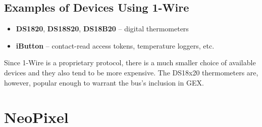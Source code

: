 \subsection{Examples of Devices Using 1-Wire}

\begin{itemize}
	\item \textbf{DS1820}, \textbf{DS18S20}, \textbf{DS18B20} -- digital thermometers
	\item \textbf{iButton} -- contact-read access tokens, temperature loggers, etc.
\end{itemize}

Since 1-Wire is a proprietary protocol, there is a much smaller choice of available devices and they also tend to be more expensive. The DS18x20 thermometers are, however, popular enough to warrant the bus's inclusion in GEX.

\section{NeoPixel} \label{sec:theory_neo}

